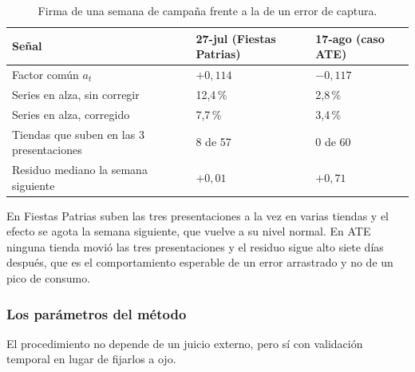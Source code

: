 \begin{table}[htbp]
\centering
\caption{Firma de una semana de campaña frente a la de un error de captura.}
\label{tab:firma}
\small
\begin{tabular}{@{}L{6cm}ll@{}}
\toprule
\textbf{Señal} & \textbf{27-jul (Fiestas Patrias)} & \textbf{17-ago (caso ATE)} \\
\midrule
Factor común $a_t$ & $+0{,}114$ & $-0{,}117$ \\
Series en alza, sin corregir & 12,4\,\% & 2,8\,\% \\
Series en alza, corregido & 7,7\,\% & 3,4\,\% \\
Tiendas que suben en las 3 presentaciones & 8 de 57 & 0 de 60 \\
Residuo mediano la semana siguiente & $+0{,}01$ & $+0{,}71$ \\
\bottomrule
\end{tabular}
\end{table}

 En Fiestas Patrias suben las tres presentaciones a la vez en varias tiendas y el efecto se agota la semana siguiente, que vuelve a su nivel normal. En ATE ninguna tienda movió las tres presentaciones y el residuo sigue alto siete días después, que es el comportamiento esperable de un error arrastrado y no de un pico de consumo.

\subsubsection{Los parámetros del método}

El procedimiento no depende de un juicio externo, pero sí  con validación temporal en lugar de fijarlos a ojo.

